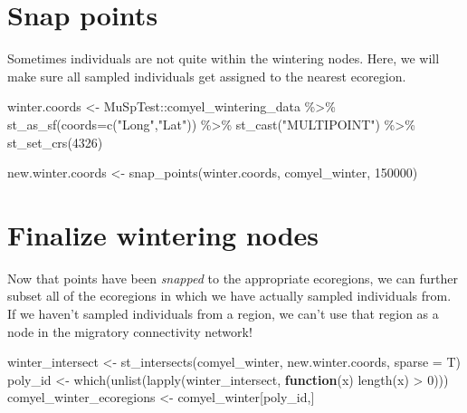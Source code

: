 \documentclass[
]{book}
\newenvironment{Shaded}{\begin{snugshade}}{\end{snugshade}}
\newcommand{\AttributeTok}[1]{\textcolor[rgb]{0.77,0.63,0.00}{#1}}
\newcommand{\ControlFlowTok}[1]{\textcolor[rgb]{0.13,0.29,0.53}{\textbf{#1}}}
\newcommand{\DecValTok}[1]{\textcolor[rgb]{0.00,0.00,0.81}{#1}}
\newcommand{\FunctionTok}[1]{\textcolor[rgb]{0.00,0.00,0.00}{#1}}
\newcommand{\NormalTok}[1]{#1}
\newcommand{\OtherTok}[1]{\textcolor[rgb]{0.56,0.35,0.01}{#1}}
\newcommand{\SpecialCharTok}[1]{\textcolor[rgb]{0.00,0.00,0.00}{#1}}
\newcommand{\StringTok}[1]{\textcolor[rgb]{0.31,0.60,0.02}{#1}}
\begin{document}
\hypertarget{snap-points}{%
\section{Snap points}\label{snap-points}}

Sometimes individuals are not quite within the wintering nodes. Here, we will make sure all sampled individuals get assigned to the nearest ecoregion.

\begin{Shaded}
\begin{Highlighting}[]
\NormalTok{winter.coords }\OtherTok{\textless{}{-}}\NormalTok{ MuSpTest}\SpecialCharTok{::}\NormalTok{comyel\_wintering\_data }\SpecialCharTok{\%\textgreater{}\%}
  \FunctionTok{st\_as\_sf}\NormalTok{(}\AttributeTok{coords=}\FunctionTok{c}\NormalTok{(}\StringTok{"Long"}\NormalTok{,}\StringTok{"Lat"}\NormalTok{)) }\SpecialCharTok{\%\textgreater{}\%}
  \FunctionTok{st\_cast}\NormalTok{(}\StringTok{"MULTIPOINT"}\NormalTok{) }\SpecialCharTok{\%\textgreater{}\%}
  \FunctionTok{st\_set\_crs}\NormalTok{(}\DecValTok{4326}\NormalTok{)}
  
\NormalTok{new.winter.coords }\OtherTok{\textless{}{-}} \FunctionTok{snap\_points}\NormalTok{(winter.coords, comyel\_winter, }\DecValTok{150000}\NormalTok{)}
\end{Highlighting}
\end{Shaded}

\hypertarget{finalize-wintering-nodes}{%
\section{Finalize wintering nodes}\label{finalize-wintering-nodes}}

Now that points have been \emph{snapped} to the appropriate ecoregions, we can further subset all of the ecoregions in which we have actually sampled individuals from. If we haven't sampled individuals from a region, we can't use that region as a node in the migratory connectivity network!

\begin{Shaded}
\begin{Highlighting}[]
\NormalTok{winter\_intersect }\OtherTok{\textless{}{-}} \FunctionTok{st\_intersects}\NormalTok{(comyel\_winter, new.winter.coords, }\AttributeTok{sparse =}\NormalTok{ T)}
\NormalTok{poly\_id }\OtherTok{\textless{}{-}} \FunctionTok{which}\NormalTok{(}\FunctionTok{unlist}\NormalTok{(}\FunctionTok{lapply}\NormalTok{(winter\_intersect, }\ControlFlowTok{function}\NormalTok{(x) }\FunctionTok{length}\NormalTok{(x) }\SpecialCharTok{\textgreater{}} \DecValTok{0}\NormalTok{)))}
\NormalTok{comyel\_winter\_ecoregions }\OtherTok{\textless{}{-}}\NormalTok{ comyel\_winter[poly\_id,]}
\end{Highlighting}
\end{Shaded}
\end{document}
